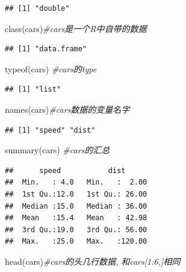 \documentclass[
]{book}
\newenvironment{Shaded}{\begin{snugshade}}{\end{snugshade}}
\newcommand{\CommentTok}[1]{\textcolor[rgb]{0.56,0.35,0.01}{\textit{#1}}}
\newcommand{\FunctionTok}[1]{\textcolor[rgb]{0.00,0.00,0.00}{#1}}
\newcommand{\NormalTok}[1]{#1}
\begin{document}
\begin{verbatim}
## [1] "double"
\end{verbatim}

\begin{Shaded}
\begin{Highlighting}[]
\FunctionTok{class}\NormalTok{(cars)}\CommentTok{\#cars是一个R中自带的数据}
\end{Highlighting}
\end{Shaded}

\begin{verbatim}
## [1] "data.frame"
\end{verbatim}

\begin{Shaded}
\begin{Highlighting}[]
\FunctionTok{typeof}\NormalTok{(cars) }\CommentTok{\#cars的type}
\end{Highlighting}
\end{Shaded}

\begin{verbatim}
## [1] "list"
\end{verbatim}

\begin{Shaded}
\begin{Highlighting}[]
\FunctionTok{names}\NormalTok{(cars)}\CommentTok{\#cars数据的变量名字}
\end{Highlighting}
\end{Shaded}

\begin{verbatim}
## [1] "speed" "dist"
\end{verbatim}

\begin{Shaded}
\begin{Highlighting}[]
\FunctionTok{summary}\NormalTok{(cars) }\CommentTok{\#cars的汇总}
\end{Highlighting}
\end{Shaded}

\begin{verbatim}
##      speed           dist       
##  Min.   : 4.0   Min.   :  2.00  
##  1st Qu.:12.0   1st Qu.: 26.00  
##  Median :15.0   Median : 36.00  
##  Mean   :15.4   Mean   : 42.98  
##  3rd Qu.:19.0   3rd Qu.: 56.00  
##  Max.   :25.0   Max.   :120.00
\end{verbatim}

\begin{Shaded}
\begin{Highlighting}[]
\FunctionTok{head}\NormalTok{(cars)}\CommentTok{\#cars的头几行数据, 和cars[1:6,]相同}
\end{Highlighting}
\end{Shaded}
\end{document}
